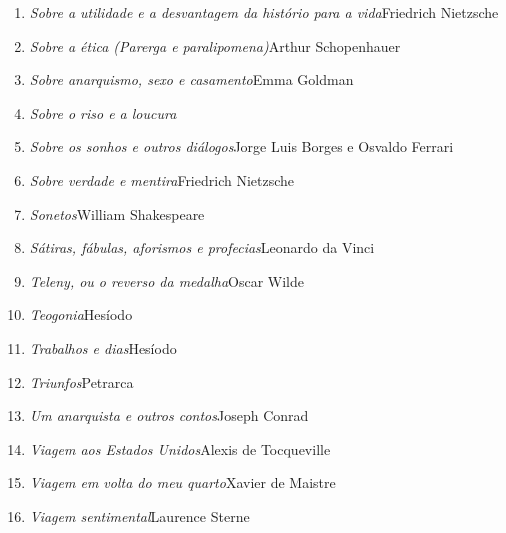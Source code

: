 \begin{enumerate}
\item \textit{Sobre a utilidade e a desvantagem da histório para a vida}\quad Friedrich Nietzsche
\item \textit{Sobre a ética (Parerga e paralipomena)}\quad Arthur Schopenhauer 
\item \textit{Sobre anarquismo, sexo e casamento}\quad Emma Goldman
\item \textit{Sobre o riso e a loucura}\quad [Hipócrates]
\item \textit{Sobre os sonhos e outros diálogos}\quad Jorge Luis Borges e Osvaldo Ferrari
\item \textit{Sobre verdade e mentira}\quad Friedrich Nietzsche
\item \textit{Sonetos}\quad William Shakespeare
\item \textit{Sátiras, fábulas, aforismos e profecias}\quad Leonardo da Vinci
\item \textit{Teleny, ou o reverso da medalha}\quad Oscar Wilde
\item \textit{Teogonia}\quad Hesíodo
\item \textit{Trabalhos e dias}\quad Hesíodo
\item \textit{Triunfos}\quad Petrarca
\item \textit{Um anarquista e outros contos}\quad Joseph Conrad
\item \textit{Viagem aos Estados Unidos}\quad Alexis de Tocqueville
\item \textit{Viagem em volta do meu quarto}\quad Xavier de Maistre 
\item \textit{Viagem sentimental}\quad Laurence Sterne
\end{enumerate}

\medskip
{}


